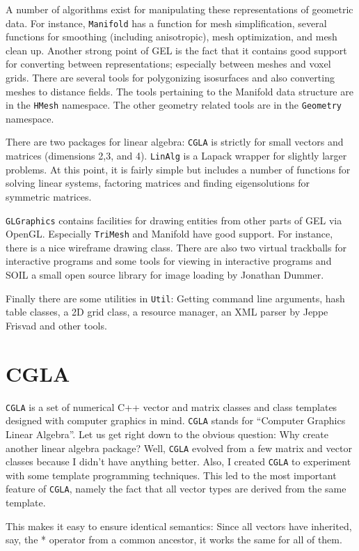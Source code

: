 \documentclass[a4paper]{article}
\begin{document}
A number of algorithms exist for manipulating these representations of geometric data. For instance, \texttt{Manifold} has a function for mesh simplification, several functions for smoothing (including anisotropic), mesh optimization, and mesh clean up.
Another strong point of GEL is the fact that it contains good support for converting between representations; especially between meshes and voxel grids. There are several tools for polygonizing isosurfaces and also converting meshes to distance fields.  The tools pertaining to the Manifold data structure are in the \texttt{HMesh} namespace. The other geometry related tools are in the \texttt{Geometry} namespace.

There are two packages for linear algebra: \texttt{CGLA} is strictly for small vectors and matrices (dimensions 2,3, and 4). \texttt{LinAlg} is a Lapack wrapper for slightly larger problems. At this point, it is fairly simple but includes a number of functions for solving linear systems, factoring matrices and finding eigensolutions for symmetric matrices.

\texttt{GLGraphics} contains facilities for drawing entities from other parts of GEL via OpenGL. Especially \texttt{TriMesh} and Manifold have good support. For instance, there is a nice wireframe drawing class. There are also two virtual trackballs for interactive programs and some tools for viewing in interactive programs and SOIL a small open source library for image loading by Jonathan Dummer.

Finally there are some utilities in \texttt{Util}: Getting command line arguments, hash table classes, a 2D grid class, a resource manager, an XML parser by Jeppe Frisvad and other tools.
%
%
\section{CGLA}
%
%
\texttt{CGLA} is a set of numerical C++ vector and matrix classes and class
templates designed with computer graphics in mind. \texttt{CGLA} stands for
``Computer Graphics Linear Algebra''. Let us get right down to the obvious question: Why create another
linear algebra package?
Well, \texttt{CGLA} evolved from a few matrix and vector classes because I
didn't have anything better. Also, I created \texttt{CGLA} to experiment with
some template programming techniques. This led to the most important
feature of \texttt{CGLA}, namely the fact that all vector types are derived
from the same template. 

This makes it easy to ensure identical semantics: Since all vectors
have inherited, say, the * operator from a common ancestor, it works
the same for all of them.
\end{document}
